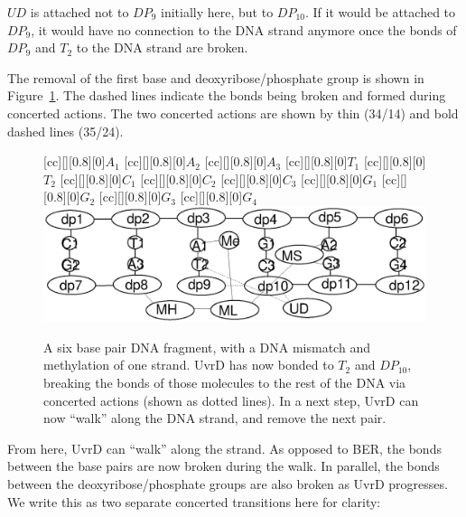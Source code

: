 $UD$ is attached not to $DP_9$ initially here, but to $DP_10$. If it would be attached to $DP_9$, it would have no connection to the DNA strand anymore once the bonds of $DP_9$ and $T_2$ to the DNA strand are broken.

The removal of the first base and deoxyribose/phosphate group is shown in Figure~\ref{fig:state3}. The dashed lines indicate the bonds being broken and formed during concerted actions. The two concerted actions are shown by thin (34/14) and bold dashed lines (35/24).

\begin{figure}[h!]
[cc][][0.8][0]{${A_1}$}
[cc][][0.8][0]{${A_2}$}
[cc][][0.8][0]{${A_3}$}
[cc][][0.8][0]{${T_1}$}
[cc][][0.8][0]{${T_2}$}
[cc][][0.8][0]{${C_1}$}
[cc][][0.8][0]{${C_2}$}
[cc][][0.8][0]{${C_3}$}
[cc][][0.8][0]{${G_1}$}
[cc][][0.8][0]{${G_2}$}
[cc][][0.8][0]{${G_3}$}
[cc][][0.8][0]{${G_4}$}
  \centering
    \includegraphics[width=1.0\textwidth]{mmr/state3}
  \caption[A six base pair DNA fragment.]{A six base pair DNA fragment, with a DNA mismatch and methylation of one strand. UvrD has now bonded to $T_2$ and $DP_{10}$, breaking the bonds of those molecules to the rest of the DNA via concerted actions (shown as dotted lines). In a next step, UvrD can now ``walk'' along the DNA strand, and remove the next pair.}
  \label{fig:state3}
\end{figure}

From here, UvrD can ``walk'' along the strand. As opposed to BER, the bonds between the base pairs are now broken during the walk. In parallel, the bonds between the deoxyribose/phosphate groups are also broken as UvrD progresses. We write this as two separate concerted transitions here for clarity:

